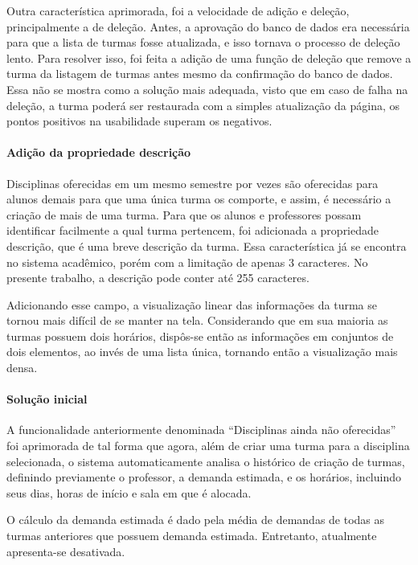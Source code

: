 Outra característica aprimorada, foi a velocidade de adição e deleção, principalmente a de deleção. Antes, a aprovação do banco de dados era necessária para que a lista de turmas fosse atualizada, e isso tornava o processo de deleção lento. Para resolver isso, foi feita a adição de uma função de deleção que remove a turma da listagem de turmas antes mesmo da confirmação do banco de dados. Essa não se mostra como a solução mais adequada, visto que em caso de falha na deleção, a turma poderá ser restaurada com a simples atualização da página, os pontos positivos na usabilidade superam os negativos.

\paragraph*{Adição da propriedade \textbf{descrição}}

Disciplinas oferecidas em um mesmo semestre por vezes são oferecidas para alunos demais para que uma única turma os comporte, e assim, é necessário a criação de mais de uma turma. Para que os alunos e professores possam identificar facilmente a qual turma pertencem, foi adicionada a propriedade descrição, que é uma breve descrição da turma. Essa característica já se encontra no sistema acadêmico, porém com a limitação de apenas 3 caracteres. No presente trabalho, a descrição pode conter até 255 caracteres.

Adicionando esse campo, a visualização linear das informações da turma se tornou mais difícil de se manter na tela. Considerando que em sua maioria as turmas possuem dois horários, dispôs-se então as informações em conjuntos de dois elementos, ao invés de uma lista única, tornando então a visualização mais densa.

\paragraph*{Solução inicial}

A funcionalidade anteriormente denominada ``Disciplinas ainda não oferecidas'' foi aprimorada de tal forma que agora, além de criar uma turma para a disciplina selecionada, o sistema automaticamente analisa o histórico de criação de turmas, definindo previamente o professor, a demanda estimada, e os horários, incluindo seus dias, horas de início e sala em que é alocada.

O cálculo da demanda estimada é dado pela média de demandas de todas as turmas anteriores que possuem demanda estimada. Entretanto, atualmente apresenta-se desativada.

